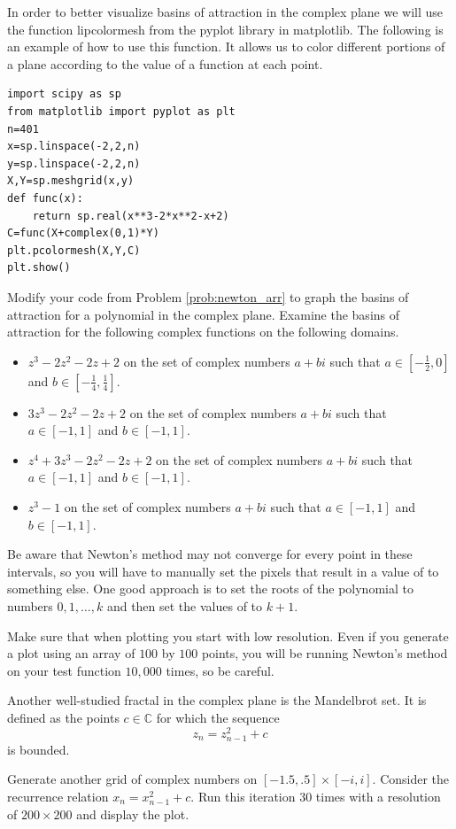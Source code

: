 In order to better visualize basins of attraction in the complex plane we will use the function li{pcolormesh} from the pyplot library in matplotlib.
The following is an example of how to use this function.
It allows us to color different portions of a plane according to the value of a function at each point.

\begin{lstlisting}
import scipy as sp
from matplotlib import pyplot as plt
n=401
x=sp.linspace(-2,2,n)
y=sp.linspace(-2,2,n)
X,Y=sp.meshgrid(x,y)
def func(x):
    return sp.real(x**3-2*x**2-x+2)
C=func(X+complex(0,1)*Y)
plt.pcolormesh(X,Y,C)
plt.show()
\end{lstlisting}

\begin{problem}
Modify your code from Problem \ref{prob:newton_arr} to graph the basins of attraction for a polynomial in the complex plane.
Examine the basins of attraction for the following complex functions on the following domains.
\begin{itemize}

\item $z^3 - 2 z^2 - 2 z + 2$ on the set of complex numbers $a + b i$ such that $a \in \left[-\frac{1}{2}, 0\right]$ and $b \in \left[-\frac{1}{4}, \frac{1}{4}\right]$.

\item $3 z^3 - 2 z^2 - 2 z + 2$ on the set of complex numbers $a + b i$ such that $a \in \left[-1, 1\right]$ and $b \in \left[-1, 1\right]$.

\item $z^4 + 3 z^3 - 2 z^2 - 2 z + 2$ on the set of complex numbers $a + b i$ such that $a \in \left[-1, 1\right]$ and $b \in \left[-1, 1\right]$.

\item $z^3 - 1$ on the set of complex numbers $a + b i$ such that $a \in \left[-1, 1\right]$ and $b \in \left[-1, 1\right]$.

\end{itemize}
Be aware that Newton's method may not converge for every point in these intervals, so you will have to manually set the pixels that result in a value of  to something else.
One good approach is to set the roots of the polynomial to numbers $0, 1, \dots, k$ and then set the values of  to $k+1$.

Make sure that when plotting you start with low resolution.
Even if you generate a plot using an array of $100$ by $100$ points, you will be running Newton's method on your test function $10,000$ times, so be careful.
\end{problem}

Another well-studied fractal in the complex plane is the Mandelbrot set.
It is defined as the points $c \in \mathbb{C}$ for which the sequence
\[z_n = z_{n-1}^2 + c\]
is bounded.

\begin{problem}
Generate another grid of complex numbers on $[-1.5,.5]\times[-i,i]$.
Consider the recurrence relation $x_n = x_{n-1}^2 + c$.
Run this iteration 30 times with a resolution of $200 \times 200$ and display the plot.
\end{problem}
